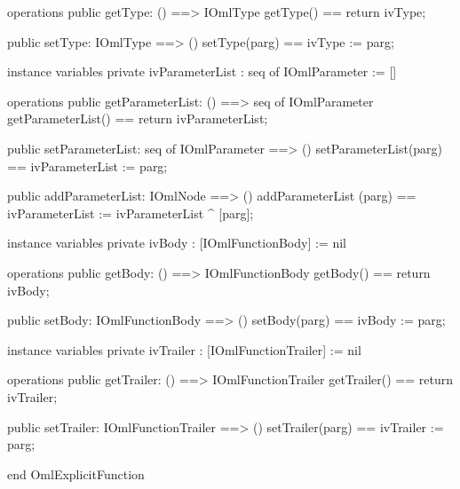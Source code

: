 \begin{vdm_al}
operations
  public getType: () ==> IOmlType
  getType() == return ivType;

  public setType: IOmlType ==> ()
  setType(parg) == ivType := parg;

instance variables
  private ivParameterList : seq of IOmlParameter := []

operations
  public getParameterList: () ==> seq of IOmlParameter
  getParameterList() == return ivParameterList;

  public setParameterList: seq of IOmlParameter ==> ()
  setParameterList(parg) == ivParameterList := parg;

  public addParameterList: IOmlNode ==> ()
  addParameterList (parg) == ivParameterList := ivParameterList ^ [parg];

instance variables
  private ivBody : [IOmlFunctionBody] := nil

operations
  public getBody: () ==> IOmlFunctionBody
  getBody() == return ivBody;

  public setBody: IOmlFunctionBody ==> ()
  setBody(parg) == ivBody := parg;

instance variables
  private ivTrailer : [IOmlFunctionTrailer] := nil

operations
  public getTrailer: () ==> IOmlFunctionTrailer
  getTrailer() == return ivTrailer;

  public setTrailer: IOmlFunctionTrailer ==> ()
  setTrailer(parg) == ivTrailer := parg;

end OmlExplicitFunction
\end{vdm_al}

